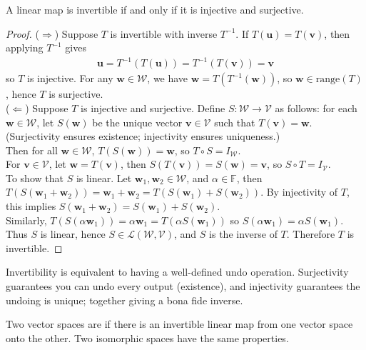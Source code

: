 \begin{proposition} A linear map is invertible if and only if it is injective and surjective.
\begin{proof} ($\Rightarrow$) Suppose $T$ is invertible with inverse $T^{-1}$. If $T (\mathbf{u}) = T (\mathbf{v})$, then applying $T^{-1}$ gives
\begin{align}
\mathbf{u} = T^{-1}(T (\mathbf{u})) = T^{-1}(T(\mathbf{v})) = \mathbf{v} \nonumber
\end{align}
so $T$ is injective. For any $\mathbf{w} \in \mathcal{W}$, we have $\mathbf{w} = T(T^{-1}(\mathbf{w}))$, so $\mathbf{w} \in \text{range}(T)$, hence $T$ is surjective.\\
($\Leftarrow$) Suppose $T$ is injective and surjective. Define $S: \mathcal{W} \rightarrow \mathcal{V}$ as follows: for each $\mathbf{w} \in \mathcal{W}$, let $S(\mathbf{w})$ be the unique vector $\mathbf{v} \in \mathcal{V}$ such that $T(\mathbf{v}) = \mathbf{w}$. (Surjectivity ensures existence; injectivity ensures uniqueness.)\\
Then for all $\mathbf{w} \in \mathcal{W}$, $T(S(\mathbf{w})) = \mathbf{w}$, so $T \circ S = I_{\mathcal{W}}$.\\
For $\mathbf{v} \in \mathcal{V}$, let $\mathbf{w} = T(\mathbf{v})$, then $S(T(\mathbf{v})) = S(\mathbf{w}) = \mathbf{v}$, so $S \circ T = I_{\mathcal{V}}$.\\
To show that $S$ is linear. Let $\mathbf{w}_1, \mathbf{w}_2 \in \mathcal{W}$, and $\alpha \in \mathbb{F}$, then $T(S(\mathbf{w}_1 + \mathbf{w}_2)) = \mathbf{w}_1 + \mathbf{w}_2 = T(S(\mathbf{w}_1) + S(\mathbf{w}_2))$. By injectivity of $T$, this implies $S(\mathbf{w}_1 + \mathbf{w}_2) = S(\mathbf{w}_1) + S(\mathbf{w}_2)$.\\
Similarly, $T(S(\alpha \mathbf{w}_1)) = \alpha \mathbf{w}_1 = T(\alpha S(\mathbf{w}_1))$ so $S(\alpha \mathbf{w}_1) = \alpha S(\mathbf{w}_1)$. Thus $S$ is linear, hence $S \in \mathcal{L}(\mathcal{W}, \mathcal{V})$, and $S$ is the inverse of $T$. Therefore $T$ is invertible.
\end{proof}
\end{proposition}

Invertibility is equivalent to having a well-defined undo operation. Surjectivity guarantees you can undo every output (existence), and injectivity guarantees the undoing is unique; together giving a bona fide inverse.

\begin{definition} Two vector spaces are  if there is an invertible linear map from one vector space onto the other. Two isomorphic spaces have the same properties.
\end{definition}

